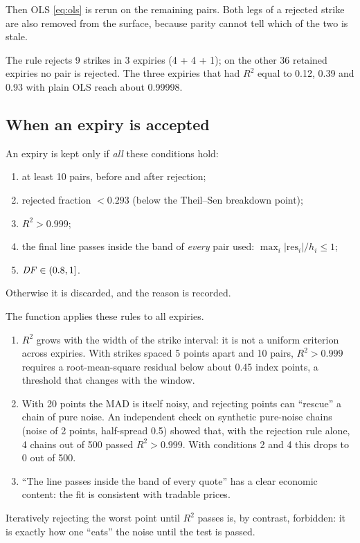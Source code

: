 Then OLS \eqref{eq:ols} is rerun on the remaining pairs. Both legs of a rejected strike are also removed from the
surface, because parity cannot tell which of the two is stale.

\begin{progetto}
The rule rejects 9 strikes in 3 expiries (4 + 4 + 1); on the other 36 retained expiries no pair is rejected. The three
expiries that had $R^2$ equal to 0.12, 0.39 and 0.93 with plain OLS reach about 0.99998.
\end{progetto}

\subsection{When an expiry is accepted}
An expiry is kept only if \emph{all} these conditions hold:
\begin{enumerate}
\item at least 10 pairs, before and after rejection;
\item rejected fraction $<0.293$ (below the Theil--Sen breakdown point);
\item $R^2>0.999$;
\item the final line passes inside the band of \emph{every} pair used: $\max_i|\text{res}_i|/h_i\le1$;
\item $\mathit{DF}\in(0.8,1]$.
\end{enumerate}
Otherwise it is discarded, and the reason is recorded.

The function  applies these rules to all expiries.

\begin{perche}[title={Why is $R^2>0.999$ not enough?}]
\begin{enumerate}
\item $R^2$ grows with the width of the strike interval: it is not a uniform criterion across expiries. With strikes
spaced 5 points apart and 10 pairs, $R^2>0.999$ requires a root-mean-square residual below about 0.45 index points,
a threshold that changes with the window.
\item With 20 points the MAD is itself noisy, and rejecting points can ``rescue'' a chain of pure noise. An
independent check on synthetic pure-noise chains (noise of 2 points, half-spread 0.5) showed that, with the
rejection rule alone, 4 chains out of 500 passed $R^2>0.999$. With conditions 2 and 4 this drops to 0 out of 500.
\item ``The line passes inside the band of every quote'' has a clear economic content: the fit is consistent with
tradable prices.
\end{enumerate}
Iteratively rejecting the worst point until $R^2$ passes is, by contrast, forbidden: it is exactly how one ``eats''
the noise until the test is passed.
\end{perche}

